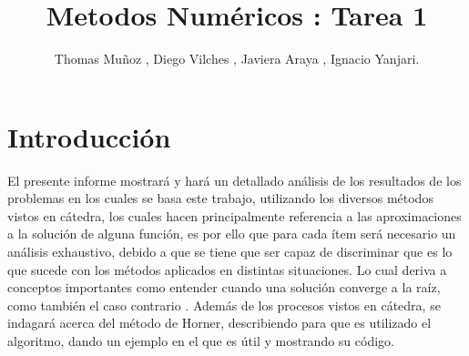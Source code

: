 \documentclass{udpreport}
\title{Metodos Numéricos : Tarea 1}
\author{Thomas Muñoz , Diego Vilches , Javiera Araya , Ignacio Yanjari.}
\begin{document}
\maketitle
\tableofcontents
\listoffigures

\chapter{Introducción}

El presente informe mostrará y hará un detallado análisis de los resultados de los problemas en los cuales se basa este trabajo, utilizando los  diversos métodos vistos en cátedra, los cuales hacen principalmente referencia a las aproximaciones a la solución de alguna función, es por ello que para cada ítem será necesario un análisis exhaustivo, debido a que se tiene que ser capaz de discriminar que es lo que sucede con los métodos aplicados en distintas situaciones. Lo cual deriva a conceptos importantes como entender cuando una solución converge a la raíz, como también el caso contrario . Además de los procesos vistos en cátedra, se indagará acerca del método de Horner, describiendo para que es utilizado el algoritmo, dando un ejemplo en el que es útil y mostrando su código.
\end{document}

